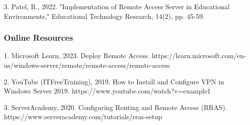 3. Patel, R., 2022. "Implementation of Remote Access Server in
Educational Environments," Educational Technology Research, 14(2), pp.
45-59.

\subsubsection{Online Resources}\label{online-resources}

1. Microsoft Learn, 2023. Deploy Remote Access.
https://learn.microsoft.com/en-us/windows-server/remote/remote-access/remote-access

2. YouTube (ITFreeTraining), 2019. How to Install and Configure VPN in
Windows Server 2019. https://www.youtube.com/watch?v=example1

3. ServerAcademy, 2020. Configuring Routing and Remote Access (RRAS).
https://www.serveracademy.com/tutorials/rras-setup
